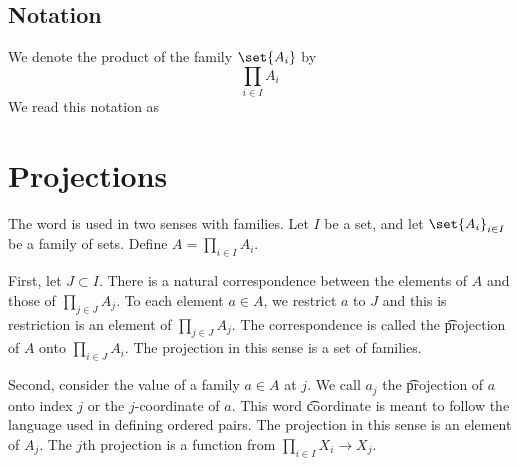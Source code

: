\subsection*{Notation}

We denote the product of the family $\set{A_i}$ by
    \[
\prod_{i \in I} A_i
    \]
We read this notation as 


\section*{Projections}

The word  is used in two senses with families.
Let $I$ be a set, and let $\set{A_i}_{i \in I}$ be a family of sets.
Define $A = \prod_{i \in I} A_i$.

First, let $J \subset I$.
There is a natural correspondence between the elements of $A$ and those of $\prod_{j \in J} A_j$.
To each element $a \in A$, we restrict $a$ to $J$ and this is restriction is an element of $\prod_{j \in J} A_j$.
The correspondence is called the \t{projection} of $A$ onto $\prod_{i \in J} A_i$.
The projection in this sense is a set of families.

Second, consider the value of a family $a \in A$ at $j$.
We call $a_j$ the \t{projection of $a$ onto index $j$} or the \t{$j$-coordinate} of $a$.
This word \t{coordinate} is meant to follow the language used in defining ordered pairs.
The projection in this sense is an element of $A_j$.
The $j$th projection is a function from $\prod_{i \in I} X_i \to X_j$.

